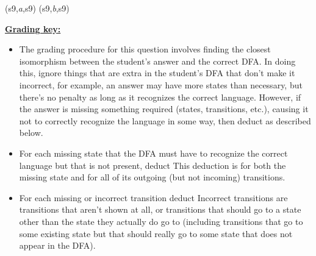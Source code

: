 \documentclass[11pt,fleqn]{article}
\begin{document}
\begin{enumerate}
\begin{automaton}
            \transition[loopdirection=left,labelposition=.5](s9,\emph{a},s9)
            \transition[loopdirection=right,labelposition=.5](s9,\emph{b},s9)

          \end{automaton}

          \vspace{-2mm}

          \begin{info}{\textbf{\underline{Grading key:}}}

            \begin{itemize}

              \addtolength{\itemsep}{1mm}

              \item The grading procedure for this question involves finding
                    the closest isomorphism between the student's answer and
                    the correct DFA.  In doing this, ignore things that are
                    extra in the student's DFA that don't make it
                    incorrect, for example, an answer may have more states
                    than necessary, but there's no penalty as long as it
                    recognizes the correct language.  However, if the answer
                    is missing something required (states, transitions,
                    etc.), causing it not to correctly recognize the
                    language in some way, then deduct as described below.

              \item For each missing state that the DFA must have to
                    recognize the correct language but that is not present,
                    deduct  This deduction is for both the
                    missing state and for all of its outgoing (but not
                    incoming) transitions.


              \item For each missing or incorrect transition deduct
                      Incorrect transitions are transitions
                    that aren't shown at all, or transitions that should
                    go to a state other than the state they actually do go
                    to (including transitions that go to some existing
                    state but that should really go to some state that
                    does not appear in the DFA).


\end{itemize}
\end{info}
\end{enumerate}
\end{document}
